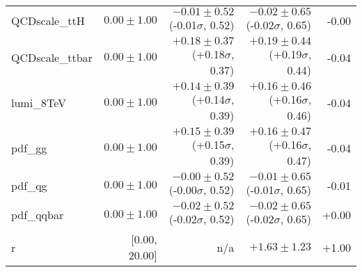 \begin{tabular}{|l|r|r|r|r|}
QCDscale\_ttH                            &  $0.00 \pm 1.00$ & $-0.01 \pm 0.52$ (-0.01$\sigma$, 0.52) & $-0.02 \pm 0.65$ (-0.02$\sigma$, 0.65) &  -0.00 \\
QCDscale\_ttbar                          &  $0.00 \pm 1.00$ & $+0.18 \pm 0.37$ (+0.18$\sigma$, 0.37) & $+0.19 \pm 0.44$ (+0.19$\sigma$, 0.44) &  -0.04 \\
lumi\_8TeV                               &  $0.00 \pm 1.00$ & $+0.14 \pm 0.39$ (+0.14$\sigma$, 0.39) & $+0.16 \pm 0.46$ (+0.16$\sigma$, 0.46) &  -0.04 \\
pdf\_gg                                  &  $0.00 \pm 1.00$ & $+0.15 \pm 0.39$ (+0.15$\sigma$, 0.39) & $+0.16 \pm 0.47$ (+0.16$\sigma$, 0.47) &  -0.04 \\
pdf\_qg                                  &  $0.00 \pm 1.00$ & $-0.00 \pm 0.52$ (-0.00$\sigma$, 0.52) & $-0.01 \pm 0.65$ (-0.01$\sigma$, 0.65) &  -0.01 \\
pdf\_qqbar                               &  $0.00 \pm 1.00$ & $-0.02 \pm 0.52$ (-0.02$\sigma$, 0.52) & $-0.02 \pm 0.65$ (-0.02$\sigma$, 0.65) &  +0.00 \\
r                                        &    [0.00, 20.00] &                           n/a  &               $+1.63 \pm 1.23$ &  +1.00 \\
 \hline
\end{tabular}
